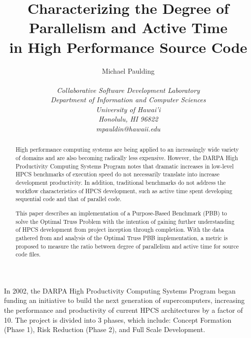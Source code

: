 \documentclass[11pt,twocolumn]{article}
\begin{document}
\title{Characterizing the Degree of Parallelism and Active Time \\
in High Performance Source Code}


\author{\protect\begin{tabular}{ccc}
Michael Paulding \\
\end{tabular}\\
\em  Collaborative Software Development Laboratory \\
\em  Department of Information and Computer Sciences \\
\em  University of Hawai'i \\
\em  Honolulu, HI 96822 \\
\em  mpauldin@hawaii.edu}
\maketitle
\thispagestyle{empty}

\begin{abstract}  %

High performance computing systems are being applied to an
increasingly wide variety of domains and are also becoming radically
less expensive.  However, the DARPA High Productivity Computing
Systems Program notes that dramatic increases in low-level HPCS
benchmarks of execution speed do not necessarily translate into
increase development productivity.  In addition, traditional
benchmarks do not address the workflow characteristics of HPCS
development, such as active time spent developing sequential code and
that of parallel code.

This paper describes an implementation of a Purpose-Based Benchmark
(PBB) to solve the Optimal Truss Problem with the intention of gaining
further understanding of HPCS development from project inception
through completion.  With the data gathered from and analysis of the
Optimal Truss PBB implementation, a metric is proposed to measure the
ratio between degree of parallelism and active time for source code
files.

\end{abstract}

\label{sec:intro}

In 2002, the DARPA High Productivity Computing Systems Program began
funding an initiative to build the next generation of supercomputers,
increasing the performance and productivity of current HPCS
architectures by a factor of 10.  The project is divided into 3
phases, which include: Concept Formation (Phase 1), Risk Reduction
(Phase 2), and Full Scale Development.
\end{document}
